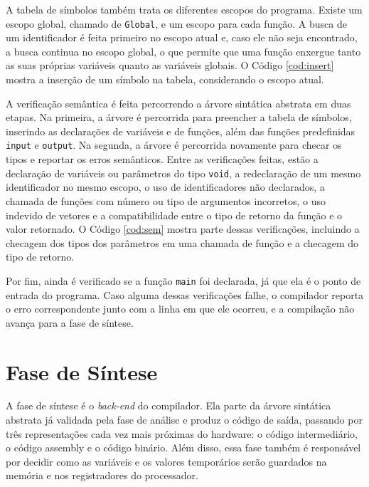 \documentclass[
	12pt,				%
	oneside,
	a4paper,			%
	english,			%
	french,				%
	spanish,			%
	brazil,				%
	]{abntex2}
\begin{document}


A tabela de símbolos também trata os diferentes escopos do programa. Existe um escopo global, chamado de \texttt{Global}, e um escopo para cada função. A busca de um identificador é feita primeiro no escopo atual e, caso ele não seja encontrado, a busca continua no escopo global, o que permite que uma função enxergue tanto as suas próprias variáveis quanto as variáveis globais. O Código \ref{cod:insert} mostra a inserção de um símbolo na tabela, considerando o escopo atual.



A verificação semântica é feita percorrendo a árvore sintática abstrata em duas etapas. Na primeira, a árvore é percorrida para preencher a tabela de símbolos, inserindo as declarações de variáveis e de funções, além das funções predefinidas \texttt{input} e \texttt{output}. Na segunda, a árvore é percorrida novamente para checar os tipos e reportar os erros semânticos. Entre as verificações feitas, estão a declaração de variáveis ou parâmetros do tipo \texttt{void}, a redeclaração de um mesmo identificador no mesmo escopo, o uso de identificadores não declarados, a chamada de funções com número ou tipo de argumentos incorretos, o uso indevido de vetores e a compatibilidade entre o tipo de retorno da função e o valor retornado. O Código \ref{cod:sem} mostra parte dessas verificações, incluindo a checagem dos tipos dos parâmetros em uma chamada de função e a checagem do tipo de retorno.



Por fim, ainda é verificado se a função \texttt{main} foi declarada, já que ela é o ponto de entrada do programa. Caso alguma dessas verificações falhe, o compilador reporta o erro correspondente junto com a linha em que ele ocorreu, e a compilação não avança para a fase de síntese.

\section{Fase de Síntese}
A fase de síntese é o \textit{back-end} do compilador. Ela parte da árvore sintática abstrata já validada pela fase de análise e produz o código de saída, passando por três representações cada vez mais próximas do hardware: o código intermediário, o código assembly e o código binário. Além disso, essa fase também é responsável por decidir como as variáveis e os valores temporários serão guardados na memória e nos registradores do processador.
\end{document}
